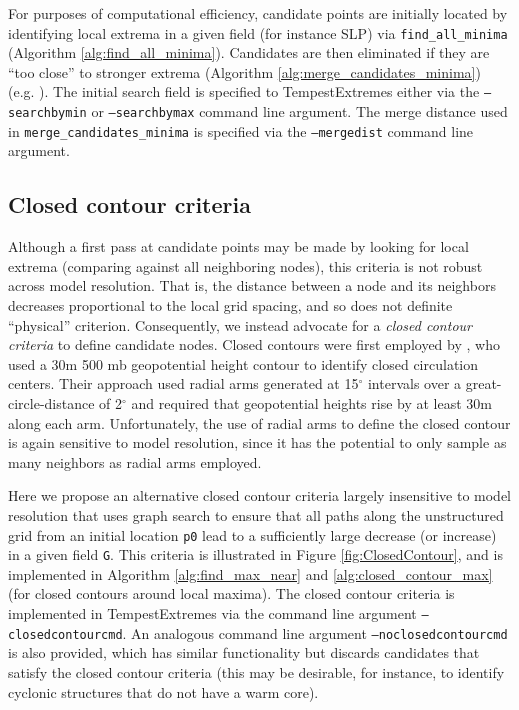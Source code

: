 \documentclass[gmdd, hvmath, online]{copernicus_discussions}
\begin{document}
For purposes of computational efficiency, candidate points are initially located by identifying local extrema in a given field (for instance SLP) via \texttt{find\_all\_minima} (Algorithm \ref{alg:find_all_minima}).  Candidates are then eliminated if they are ``too close'' to stronger extrema (Algorithm \ref{alg:merge_candidates_minima}) (e.g. \cite{pinto2005sensitivities}).  The initial search field is specified to TempestExtremes either via the \texttt{--searchbymin} or \texttt{--searchbymax} command line argument.  The merge distance used in \texttt{merge\_candidates\_minima} is specified via the \texttt{--mergedist} command line argument.

\subsection{Closed contour criteria} \label{sec:ClosedContour}

Although a first pass at candidate points may be made by looking for local extrema (comparing against all neighboring nodes), this criteria is not robust across model resolution.  That is, the distance between a node and its neighbors decreases proportional to the local grid spacing, and so does not definite ``physical'' criterion.  Consequently, we instead advocate for a \textit{closed contour criteria} to define candidate nodes.  Closed contours were first employed by \cite{bell198915}, who used a 30m 500 mb geopotential height contour to identify closed circulation centers.  Their approach used radial arms generated at 15$^\circ$ intervals over a great-circle-distance of 2$^\circ$ and required that geopotential heights rise by at least 30m along each arm.  Unfortunately, the use of radial arms to define the closed contour is again sensitive to model resolution, since it has the potential to only sample as many neighbors as radial arms employed.

Here we propose an alternative closed contour criteria largely insensitive to model resolution that uses graph search to ensure that all paths along the unstructured grid from an initial location \texttt{p0} lead to a sufficiently large decrease (or increase) in a given field \texttt{G}.  This criteria is illustrated in Figure \ref{fig:ClosedContour}, and is implemented in Algorithm \ref{alg:find_max_near} and \ref{alg:closed_contour_max} (for closed contours around local maxima).  The closed contour criteria is implemented in TempestExtremes via the command line argument \texttt{--closedcontourcmd}.  An analogous command line argument \texttt{--noclosedcontourcmd} is also provided, which has similar functionality but discards candidates that satisfy the closed contour criteria (this may be desirable, for instance, to identify cyclonic structures that do not have a warm core).
\end{document}
